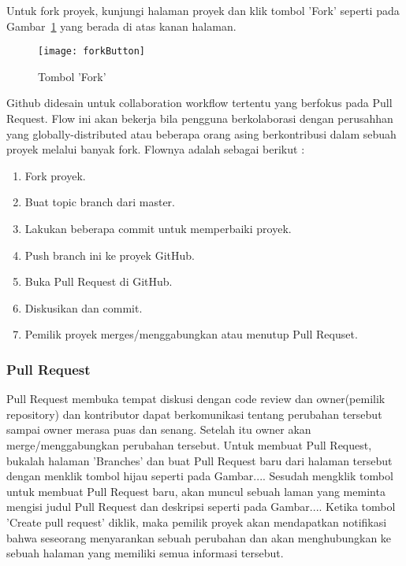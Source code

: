 Untuk fork proyek, kunjungi halaman proyek dan klik tombol 'Fork' seperti pada Gambar~\ref{fig:forkButton} yang berada di atas kanan halaman. 

\begin{figure}[H]
	\centering  
	\texttt{[image: forkButton]}  
	\caption[Tombol 'Fork']{Tombol 'Fork'}
	\label{fig:forkButton} 
\end{figure}

Github didesain untuk collaboration workflow tertentu yang berfokus pada Pull Request. Flow ini akan bekerja bila pengguna berkolaborasi dengan perusahhan yang globally-distributed atau beberapa orang asing berkontribusi dalam sebuah proyek melalui banyak fork. Flownya adalah sebagai berikut :

\begin{enumerate}
	\item Fork proyek.
	\item Buat topic branch dari master.
	\item Lakukan beberapa commit untuk memperbaiki proyek.
	\item Push branch ini ke proyek GitHub.
	\item Buka Pull Request di GitHub.
	\item Diskusikan dan commit.
	\item Pemilik proyek merges/menggabungkan atau menutup Pull Requset.
\end{enumerate}

\subsubsection{Pull Request}
Pull Request membuka tempat diskusi dengan code review dan owner(pemilik repository) dan kontributor dapat berkomunikasi tentang perubahan tersebut sampai owner merasa puas dan senang. Setelah itu owner akan merge/menggabungkan perubahan tersebut. Untuk membuat Pull Request, bukalah halaman 'Branches' dan buat Pull Request baru dari halaman tersebut dengan menklik tombol hijau seperti pada Gambar.... Sesudah mengklik tombol untuk membuat Pull Request baru, akan muncul sebuah laman yang meminta mengisi judul Pull Request dan deskripsi seperti pada Gambar.... Ketika tombol 'Create pull request' diklik,  maka pemilik proyek akan mendapatkan notifikasi bahwa seseorang menyarankan sebuah perubahan dan akan menghubungkan ke sebuah halaman yang memiliki semua informasi tersebut.

